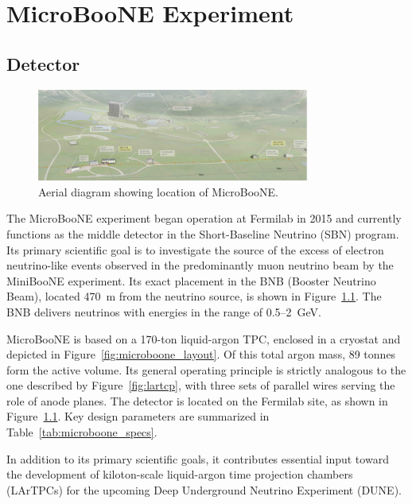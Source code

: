\documentclass{pracalicmgr}
\begin{document}
\chapter{MicroBooNE Experiment}

\section{Detector}

\begin{figure}[H]
    \centering
    \includegraphics[width=0.80\textwidth]{src/microbooneBirdseyes.pdf}
    \caption{Aerial diagram showing location of MicroBooNE.\cite{MicroBooNEDesign}}
    \label{fig:microboone_birdseye}
\end{figure}

The MicroBooNE experiment began operation at Fermilab in 2015 and currently functions as the middle detector in the Short-Baseline Neutrino (SBN) program. Its primary scientific goal is to investigate the source of the excess of electron neutrino-like events observed in the predominantly muon neutrino beam by the MiniBooNE experiment. Its exact placement in the BNB (Booster Neutrino Beam), located 470~m from the neutrino source, is shown in Figure~\ref{fig:microboone_birdseye}. The BNB delivers neutrinos with energies in the range of 0.5–2~GeV.

MicroBooNE is based on a 170-ton liquid-argon TPC, enclosed in a cryostat and depicted in Figure~\ref{fig:microboone_layout}. Of this total argon mass, 89 tonnes form the active volume. Its general operating principle is strictly analogous to the one described by Figure~\ref{fig:lartcp}, with three sets of parallel wires serving the role of anode planes. The detector is located on the Fermilab site, as shown in Figure~\ref{fig:microboone_birdseye}. Key design parameters are summarized in Table~\ref{tab:microboone_specs}\cite{MicroBooNEDesign}.

In addition to its primary scientific goals, it contributes essential input toward the development of kiloton-scale liquid-argon time projection chambers (LArTPCs) for the upcoming Deep Underground Neutrino Experiment (DUNE).
\end{document}
